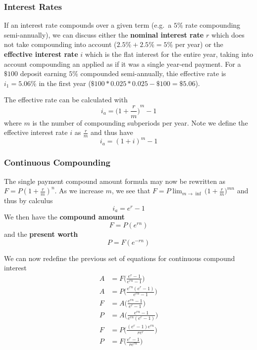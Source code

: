 \documentclass[12pt]{article}
\begin{document}
\subsubsection{Interest Rates}
If an interest rate compounds over a given term (e.g.\ a $5\%$ rate compounding semi-annually), we can discuss either the {\bf nominal interest rate} $r$ which does not take compounding into account ($2.5\% + 2.5\% = 5\%$ per year) or the {\bf effective interest rate} $i$ which is the flat interest for the entire year, taking into account compounding an applied as if it was a single year-end payment. For a $\$100$ deposit earning $5\%$ compounded semi-annually, thie effective rate is $i_1 = 5.06\%$ in the first year ($\$100 * 0.025 * 0.025 - \$100 = \$5.06$).

The effective rate can be calculated with \[ i_a = {\bigg(1 + \frac{r}{m} \bigg)}^m - 1 \] where $m$ is the number of compounding subperiods per year. Note we define the effective interest rate $i$ as $\frac{r}{m}$ and thus have \[ i_a = {(1 + i )}^m - 1 \]

\subsubsection{Continuous Compounding}
The single payment compound amount formula may now be rewritten as $F = P{(1 + \frac{r}{m})}^n$. As we increase $m$, we see that $F = P \lim_{m\to\inf} {\bigg(1 + \frac{r}{m} \bigg)}^{mn}$ and thus by calculus \[ i_a = e^r - 1 \] We then have the {\bf compound amount} \[ F = P(e^{rn}) \] and the {\bf present worth} \[ P = F(e^{-rn}) \]

We can now redefine the previous set of equations for continuous compound interest
\begin{align*}
A &= F \bigg( \frac{e^r - 1}{e^{rn} - 1} \bigg)\\
A &= P \bigg( \frac{e^{rn}(e^r - 1)}{e^{rn} - 1} \bigg)\\
F &= A \bigg( \frac{e^{rn} - 1}{e^r - 1} \bigg)\\
P &= A \bigg( \frac{e^{rn} - 1}{e^{rn}(e^r - 1)} \bigg)\\
F &= P \bigg( \frac{(e^r - 1)e^{rn}}{re^r} \bigg)\\
P &= F \bigg( \frac{e^r - 1}{re^{rn}} \bigg)\\
\end{align*}
\end{document}
